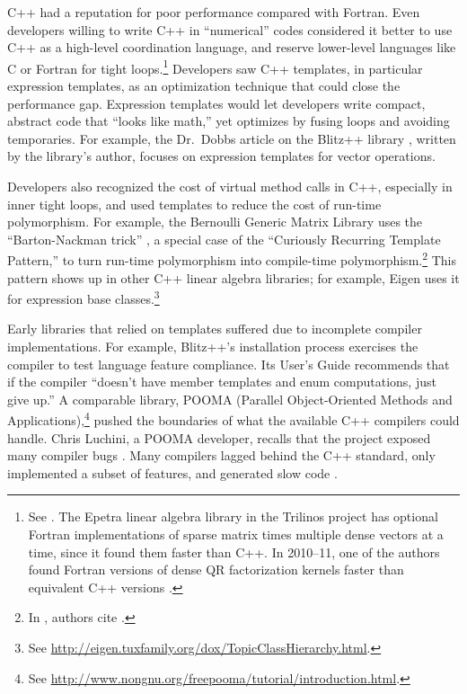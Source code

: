 C++ had a reputation for poor performance compared with Fortran. Even
developers willing to write C++ in ``numerical'' codes considered it
better to use C++ as a high-level coordination language, and reserve
lower-level languages like C or Fortran for tight loops.\footnote{See
  \cite{Arge1997}.  The Epetra linear algebra library in the Trilinos
  project \cite{heroux2005trilinos} has optional Fortran
  implementations of sparse matrix times multiple dense vectors at a
  time, since it found them faster than C++.  In 2010--11, one of the
  authors found Fortran versions of dense QR factorization kernels
  faster than equivalent C++ versions \cite{hoemmen2011comm}.}
Developers saw C++ templates, in particular expression templates, as
an optimization technique that could close the performance
gap. Expression templates would let developers write compact, abstract
code that ``looks like math,'' yet optimizes by fusing loops and
avoiding temporaries. For example, the Dr.\ Dobbs article
\cite{dobbsblitz1997} on the Blitz++ library \cite{blitz2005}, written
by the library's author, focuses on expression templates for vector
operations.

Developers also recognized the cost of virtual method calls in C++,
especially in inner tight loops, and used templates to reduce the cost
of run-time polymorphism.  For example, the Bernoulli Generic Matrix
Library uses the ``Barton-Nackman trick'' \cite{Barton1994},
a special case of the ``Curiously Recurring Template Pattern,'' to
turn run-time polymorphism into compile-time polymorphism.\footnote{In
  \cite{Mateev2000}, authors cite \cite{Veldhuizen2000}.} This pattern
shows up in other C++ linear algebra libraries; for example, Eigen
uses it for expression base classes.\footnote{See
  \url{http://eigen.tuxfamily.org/dox/TopicClassHierarchy.html}.}

Early libraries that relied on templates suffered due to incomplete
compiler implementations. For example, Blitz++'s installation process
exercises the compiler to test language feature compliance. Its User's
Guide recommends that if the compiler ``doesn't have member templates
and enum computations, just give up.''\cite[Section 1.4.3]{blitz2005}
A comparable library, POOMA (Parallel Object-Oriented Methods and
Applications),\footnote{See
  \url{http://www.nongnu.org/freepooma/tutorial/introduction.html}.}
pushed the boundaries of what the available C++ compilers could
handle. Chris Luchini, a POOMA developer, recalls that the project
exposed many compiler bugs \cite{hoemmen2018history}.  Many compilers
lagged behind the C++ standard, only implemented a subset of features,
and generated slow code \cite{Mateev2000}.

